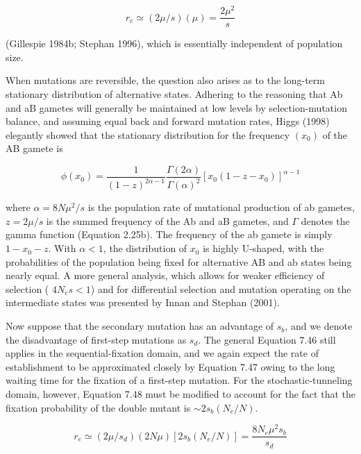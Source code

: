 \documentclass{article}
\begin{document}
\begin{equation}
r_{e}\simeq(2\mu/s)(\mu)=\frac{2\mu^{2}}{s}
\tag{7.48}
\label{eq:7_48}
\end{equation}

(Gillespie 1984b; Stephan 1996), which is essentially independent of population size.

When mutations are reversible, the question also arises as to the long-term stationary distribution of alternative states. Adhering to the reasoning that Ab and aB gametes will generally be maintained at low levels by selection-mutation balance, and assuming equal back and forward mutation rates, Higgs (1998) elegantly showed that the stationary distribution for the frequency  $ (x_{0}) $ of the AB gamete is

\begin{equation}
\phi(x_{0})=\frac{1}{(1-z)^{2\alpha-1}}\frac{\Gamma(2\alpha)}{\Gamma(\alpha)^{2}}\left[x_{0}(1-z-x_{0})\right]^{\alpha-1}
\tag{7.49}
\label{eq:7_49}
\end{equation}

where  $ \alpha = 8N\mu^2/s $ is the population rate of mutational production of ab gametes,  $ z = 2\mu/s $ is the summed frequency of the Ab and aB gametes, and  $ \Gamma $ denotes the gamma function (Equation 2.25b). The frequency of the ab gamete is simply  $ 1 - x_0 - z $. With  $ \alpha < 1 $, the distribution of  $ x_0 $ is highly U-shaped, with the probabilities of the population being fixed for alternative AB and ab states being nearly equal. A more general analysis, which allows for weaker efficiency of selection ( $ 4N_e s < 1 $) and for differential selection and mutation operating on the intermediate states was presented by Innan and Stephan (2001).

Now suppose that the secondary mutation has an advantage of  $ s_b $, and we denote the disadvantage of first-step mutations as  $ s_d $. The general Equation 7.46 still applies in the sequential-fixation domain, and we again expect the rate of establishment to be approximated closely by Equation 7.47 owing to the long waiting time for the fixation of a first-step mutation. For the stochastic-tunneling domain, however, Equation 7.48 must be modified to account for the fact that the fixation probability of the double mutant is  $ \sim 2s_b(N_e/N) $.

\begin{equation}
r_{e}\simeq(2\mu/s_{d})(2N\mu)[2s_{b}(N_{e}/N)]=\frac{8N_{e}\mu^{2}s_{b}}{s_{d}}
\tag{7.50}
\label{eq:7_50}
\end{equation}
\end{document}
